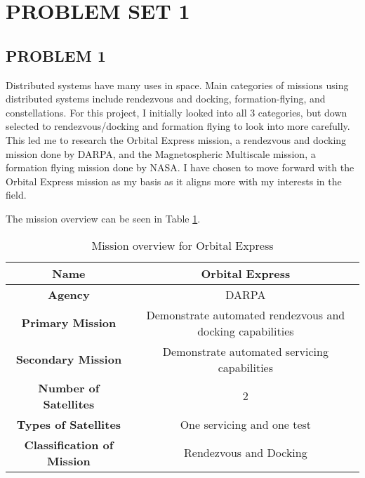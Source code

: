 \documentclass[12pt,a4paper,notitlepage]{article}
\begin{document}

\section{\Large PROBLEM SET 1}
\subsection{PROBLEM 1}
Distributed systems have many uses in space. Main categories of missions using distributed systems include rendezvous and docking, formation-flying, and constellations. For this project, I initially looked into all 3 categories, but down selected to rendezvous/docking and formation flying to look into more carefully. This led me to research the Orbital Express mission, a rendezvous and docking mission done by DARPA, and the Magnetospheric Multiscale mission, a formation flying mission done by NASA. I have chosen to move forward with the Orbital Express mission as my basis as it aligns more with my interests in the field. 

The mission overview can be seen in Table \ref{table:mission_overview}.

\begin{table}[h!]
\begin{center}
\begin{tabular}{ |c|c| }
 \hline
 \textbf{Name} & Orbital Express \\ \hline
 \textbf{Agency} & DARPA \\ \hline
 \textbf{Primary Mission} & Demonstrate automated rendezvous and docking capabilities \\ \hline
 \textbf{Secondary Mission} & Demonstrate automated servicing capabilities \\ \hline
 \textbf{Number of Satellites} & 2 \\ \hline
 \textbf{Types of Satellites} & One servicing and one test \\ \hline
 \textbf{Classification of Mission} & Rendezvous and Docking \\
 \hline
\end{tabular}
\caption{Mission overview for Orbital Express}
\label{table:mission_overview}
\end{center}
\end{table}
\end{document}
